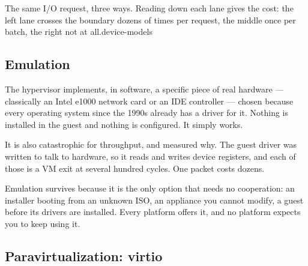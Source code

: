 {}%
{The same I/O request, three ways. Reading down each lane gives the cost: the
left lane crosses the boundary dozens of times per request, the middle once per
batch, the right not at all.}{device-models}

\subsection{Emulation}

The hypervisor implements, in software, a specific piece of real hardware ---
classically an Intel e1000 network card or an IDE controller --- chosen because
every operating system since the 1990s already has a driver for it. Nothing is
installed in the guest and nothing is configured. It simply works.

It is also catastrophic for throughput, and  measured why.
The guest driver was written to talk to hardware, so it reads and writes device
registers, and each of those is a VM exit at several hundred cycles. One packet
costs dozens.

Emulation survives because it is the only option that needs no cooperation: an
installer booting from an unknown ISO, an appliance you cannot modify, a guest
before its drivers are installed. Every platform offers it, and no platform
expects you to keep using it.

\subsection{Paravirtualization: virtio}


